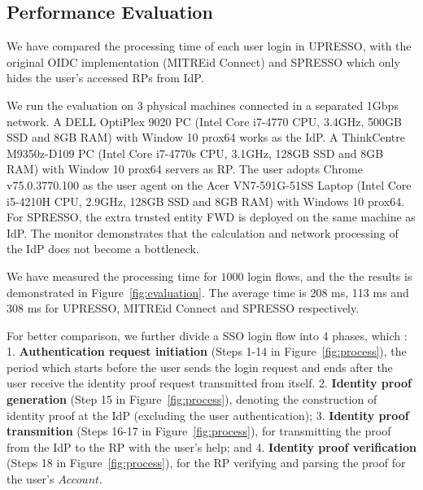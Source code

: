 \subsection{Performance Evaluation}
\label{sec:evaluation}
We have compared the processing time of each user login in UPRESSO, with the original OIDC implementation (MITREid Connect) and SPRESSO which only hides the user's accessed RPs from IdP.

We run the evaluation on 3 physical machines connected in a separated 1Gbps network. A DELL OptiPlex 9020 PC (Intel Core i7-4770 CPU, 3.4GHz, 500GB SSD and 8GB RAM) with Window 10 prox64 works as the IdP. A ThinkCentre M9350z-D109 PC (Intel Core i7-4770s CPU, 3.1GHz, 128GB SSD and 8GB RAM) with  Window 10 prox64 servers as RP. The user adopts Chrome v75.0.3770.100 as the user agent on the Acer VN7-591G-51SS Laptop (Intel Core i5-4210H CPU, 2.9GHz, 128GB SSD and 8GB RAM) with  Windows 10 prox64. For SPRESSO, the extra trusted entity FWD is deployed on the same machine as IdP. The monitor demonstrates that  the calculation and network processing of the IdP does not become a bottleneck.

We have measured the processing time for $1000$ login flows, and the the results is demonstrated in Figure~\ref{fig:evaluation}. The average time is 208 ms, 113 ms and 308 ms for UPRESSO, MITREid Connect and SPRESSO respectively.


For better comparison, we further divide a SSO login flow into 4 phases, which : 1. \textbf{Authentication request initiation} (Steps 1-14 in Figure~\ref{fig:process}), the period which starts before the user sends the login request and ends after the user receive the identity proof request transmitted from itself.
2. \textbf{Identity proof generation} (Step 15 in Figure~\ref{fig:process}), denoting the construction of identity proof at the IdP (excluding the user authentication); 3. \textbf{Identity proof transmition} (Steps 16-17 in Figure~\ref{fig:process}), for transmitting the proof from the IdP to the RP with the user's help; and 4. \textbf{Identity proof verification} (Steps 18 in Figure~\ref{fig:process}), for the RP  verifying and parsing the proof for the user's $Account$. 



